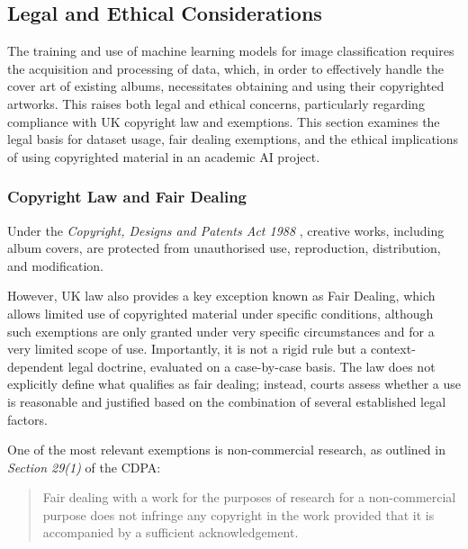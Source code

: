         \subsection{Legal and Ethical Considerations}
    
          The training and use of machine learning models for image classification requires the acquisition and processing of data, which, in order to effectively handle the cover art of existing albums, necessitates obtaining and using their copyrighted artworks. This raises both legal and ethical concerns, particularly regarding compliance with UK copyright law and exemptions. This section examines the legal basis for dataset usage, fair dealing exemptions, and the ethical implications of using copyrighted material in an academic AI project.
    
              \subsubsection{Copyright Law and Fair Dealing}
                  Under the \textit{Copyright, Designs and Patents Act 1988} \cite{cdpa1988}, creative works, including album covers, are protected from unauthorised use, reproduction, distribution, and modification.
          
                  However, UK law also provides a key exception known as Fair Dealing, which allows limited use of copyrighted material under specific conditions, although such exemptions are only granted under very specific circumstances and for a very limited scope of use. Importantly, it is not a rigid rule but a context-dependent legal doctrine, evaluated on a case-by-case basis. The law does not explicitly define what qualifies as fair dealing; instead, courts assess whether a use is reasonable and justified based on the combination of several established legal factors.
                  
                  One of the most relevant exemptions is non-commercial research, as outlined in \textit{Section 29(1)} of the CDPA:
                  \begin{quote}
                      Fair dealing with a work for the purposes of research for a non-commercial purpose does not infringe any copyright in the work provided that it is accompanied by a sufficient acknowledgement. \cite{cdpa1988}
                  \end{quote}
    
